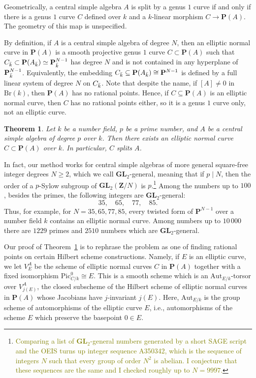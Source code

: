 \documentclass[10pt,letterpaper,twoside]{article}
\newcommand{\BA}[1]{\textcolor{olive}{#1}}
\renewcommand{\1}{\mathbf{1}}
\newcommand{\bP}{\mathbf{P}}
\newcommand{\bZ}{\mathbf{Z}}
\newcommand{\Aut}{\mathrm{Aut}}
\renewcommand{\geq}{\geqslant}
\newcommand{\GL}{\mathbf{GL}}
\newcommand{\Pic}{\mathrm{Pic}}
\newcommand{\Br}{\mathrm{Br}}
\newcommand{\iso}{\cong}
\theoremstyle{plain}
\newtheorem{theorem}{Theorem}[section]
\theoremstyle{plain}
\theoremstyle{definition}
\theoremstyle{named}
\theoremstyle{definition}
\begin{document}
Geometrically, a central simple algebra $A$ is split by a genus $1$ curve if and only if there is a genus $1$ curve $C$
defined over $k$ and a $k$-linear morphism $C\rightarrow\bP(A)$. The geometry of this map is
unspecified.

By definition, if $A$ is a central simple algebra of degree $N$, then an elliptic normal curve in $\bP(A)$ is a
smooth projective genus $1$ curve $C\subset \bP(A)$ such that $C_{\Bar{k}}\subset
\bP(A_{\Bar{k}})\simeq \bP_{\Bar{k}}^{N-1}$ has degree $N$ and is not contained in any hyperplane of
$\bP_{\Bar{k}}^{N-1}$.
Equivalently, the embedding
$C_{\Bar{k}}\subseteq\bP(A_{\Bar{k}})\iso\bP^{N-1}$ is defined by a full linear system of degree $N$
on $C_{\Bar{k}}$. Note that despite the name, if $[A]\neq 0$ in $\Br(k)$, then $\bP(A)$ has no
rational points. Hence, if $C\subseteq\bP(A)$ is an elliptic normal curve, then $C$ has no rational points either, so it is a
genus $1$ curve only, not an elliptic curve.

\begin{theorem}\label{mainthm}
    Let $k$ be a number field, $p$ be a prime number, and $A$ be a central simple algebra of degree
    $p$ over $k$. Then there exists an elliptic normal curve $C\subset \bP(A)$ over $k$. In
    particular, $C$ splits $A$.
\end{theorem}

In fact, our method works for central simple algebras of more general square-free integer degrees
$N\geq 2$, which we
call $\GL_2$-general, meaning that if $p\;|\;N$, then the order of a $p$-Sylow subgroup of
$\GL_2(\bZ/N)$ is $p$.\footnote{\BA{Comparing a list of $\GL_2$-general numbers generated by a short
{\ttfamily SAGE} script and the {\ttfamily OEIS} turns up integer sequence {\ttfamily A350342},
which is the sequence of integers $N$ such that every group of order $N^2$ is abelian. I conjecture
that these sequences are the same and I checked roughly up to $N=9997$.}} Among the numbers up to $100$, besides the primes, the following integers are
$\GL_2$-general:
$$35,\quad 65,\quad 77,\quad 85.$$
Thus, for example, for $N=35,65,77,85$, every twisted form of $\bP^{N-1}$ over a number field $k$ contains an
elliptic normal curve. Among numbers up to $10\,000$ there are $1229$ primes and $2510$ numbers which
are $\GL_2$-general.

Our proof of Theorem~\ref{mainthm} is to rephrase the problem as one of finding rational points on
certain Hilbert scheme constructions. Namely, if $E$ is an elliptic curve, we let $V_E^A$ be the scheme of elliptic normal curves
$C$ in $\bP(A)$ together with a fixed isomorphism $\Pic_{C/k}^0\iso E$.
This is a smooth scheme which is an $\Aut_{E/k}$-torsor over $V_{j(E)}^A$, the closed subscheme of the
Hilbert scheme of elliptic normal curves in $\bP(A)$ whose Jacobians have $j$-invariant $j(E)$.
Here, $\Aut_{E/k}$ is the group scheme of automorphisms of the elliptic curve $E$, i.e.,
automorphisms of the scheme $E$ which preserve the basepoint $0\in E$.
\end{document}
